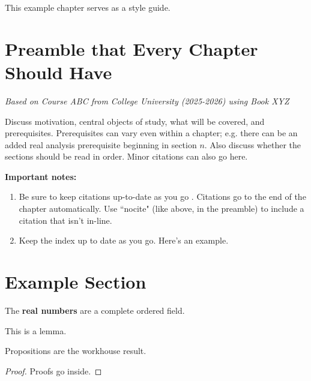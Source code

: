 \documentclass[../../main.tex]{subfiles}
\begin{document}

This example chapter serves as a style guide.

\section*{Preamble that Every Chapter Should Have}

\noindent\textit{Based on Course ABC from College University (2025-2026) using Book XYZ} \nocite{example2025}
\newline

Discuss motivation, central objects of study, what will be covered, and prerequisites. Prerequisites can vary even within a chapter; e.g. there can be an added real analysis prerequisite beginning in section $n$. Also discuss whether the sections should be read in order. Minor citations can also go here. 

\textbf{Important notes:} 
\begin{enumerate}
    \item Be sure to keep citations up-to-date as you go \cite{example2026}. Citations go to the end of the chapter automatically. Use ``nocite" (like above, in the preamble) to include a citation that isn't in-line.
    \item Keep the index up to date as you go. Here's an example.
\end{enumerate}

\section*{Example Section}

\begin{definition}
    The \textbf{real numbers} are a complete ordered field.
\end{definition}

\begin{lemma}\label{lemma:example}
    This is a lemma.
\end{lemma}

\begin{proposition}
    Propositions are the workhouse result.
    \begin{proof}
        Proofs go inside.
    \end{proof}
\end{proposition}
\end{document}
